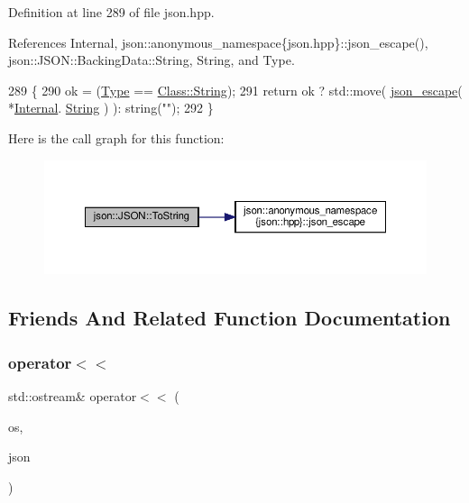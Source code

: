 Definition at line 289 of file json.\+hpp.



References Internal, json\+::anonymous\+\_\+namespace\{json.\+hpp\}\+::json\+\_\+escape(), json\+::\+J\+S\+O\+N\+::\+Backing\+Data\+::\+String, String, and Type.


\begin{DoxyCode}
289                                           \{
290             ok = (\mbox{\hyperlink{classjson_1_1_j_s_o_n_a3fa6923afa41bdfe38077fbc0079aaf5}{Type}} == \mbox{\hyperlink{classjson_1_1_j_s_o_n_a762f55df6d407c1af61607ed516ffe07a27118326006d3829667a400ad23d5d98}{Class::String}});
291             \textcolor{keywordflow}{return} ok ? std::move( \mbox{\hyperlink{namespacejson_1_1anonymous__namespace_02json_8hpp_03_a623a6fca4cd1735d2bf3d081b875a350}{json\_escape}}( *\mbox{\hyperlink{classjson_1_1_j_s_o_n_a1e2a064794c3d55c8bb8887fc5734947}{Internal}}.
      \mbox{\hyperlink{unionjson_1_1_j_s_o_n_1_1_backing_data_a883c18d113d2e55767a9530f06a9c772}{String}} ) ): string(\textcolor{stringliteral}{""});
292         \}
\end{DoxyCode}
Here is the call graph for this function\+:
\nopagebreak
\begin{figure}[H]
\begin{center}
\leavevmode
\includegraphics[width=350pt]{classjson_1_1_j_s_o_n_a08f4e57ef30b5dc6881179017e2196d0_cgraph}
\end{center}
\end{figure}


\subsection{Friends And Related Function Documentation}
\mbox{\label{classjson_1_1_j_s_o_n_a5513ab67f2660e88d73c75fc83b6945c}} 
\subsubsection{\texorpdfstring{operator$<$$<$}{operator<<}}
{\footnotesize\ttfamily std\+::ostream\& operator$<$$<$ (\begin{DoxyParamCaption}\item[{std\+::ostream \&}]{os,  }\item[{const \mbox{\hyperlink{classjson_1_1_j_s_o_n}{J\+S\+ON}} \&}]{json }\end{DoxyParamCaption})\hspace{0.3cm}{\ttfamily [friend]}}



